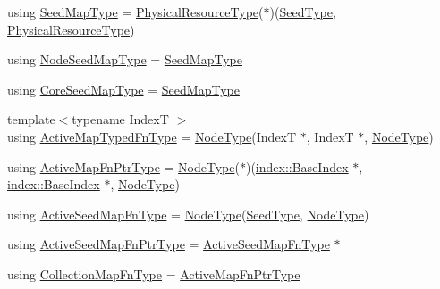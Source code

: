 \begin{DoxyCompactItemize}
\item 
using \hyperlink{namespacevt_1_1mapping_a1c1409d9af8d1ac402af022a65be4a4d}{Seed\+Map\+Type} = \hyperlink{namespacevt_a2dc36fcada816dc6d11774d650328ee9}{Physical\+Resource\+Type}($\ast$)(\hyperlink{namespacevt_ae2e13198bdef4d5b8e603d6c1c7f0969}{Seed\+Type}, \hyperlink{namespacevt_a2dc36fcada816dc6d11774d650328ee9}{Physical\+Resource\+Type})
\item 
using \hyperlink{namespacevt_1_1mapping_a84d654b657f2dbe639ada06ae688e4c7}{Node\+Seed\+Map\+Type} = \hyperlink{namespacevt_1_1mapping_a1c1409d9af8d1ac402af022a65be4a4d}{Seed\+Map\+Type}
\item 
using \hyperlink{namespacevt_1_1mapping_a963a37316992c8805e9a381a07380de0}{Core\+Seed\+Map\+Type} = \hyperlink{namespacevt_1_1mapping_a1c1409d9af8d1ac402af022a65be4a4d}{Seed\+Map\+Type}
\item 
{\footnotesize template$<$typename IndexT $>$ }\\using \hyperlink{namespacevt_1_1mapping_ad7c0812428b339edd904a865e0080ecd}{Active\+Map\+Typed\+Fn\+Type} = \hyperlink{namespacevt_a866da9d0efc19c0a1ce79e9e492f47e2}{Node\+Type}(IndexT $\ast$, IndexT $\ast$, \hyperlink{namespacevt_a866da9d0efc19c0a1ce79e9e492f47e2}{Node\+Type})
\item 
using \hyperlink{namespacevt_1_1mapping_a748d5efb71ca5878288d5809f57d7254}{Active\+Map\+Fn\+Ptr\+Type} = \hyperlink{namespacevt_a866da9d0efc19c0a1ce79e9e492f47e2}{Node\+Type}($\ast$)(\hyperlink{structvt_1_1index_1_1_base_index}{index\+::\+Base\+Index} $\ast$, \hyperlink{structvt_1_1index_1_1_base_index}{index\+::\+Base\+Index} $\ast$, \hyperlink{namespacevt_a866da9d0efc19c0a1ce79e9e492f47e2}{Node\+Type})
\item 
using \hyperlink{namespacevt_1_1mapping_ab9cfcd87eb3ff00e63478d0197056b7e}{Active\+Seed\+Map\+Fn\+Type} = \hyperlink{namespacevt_a866da9d0efc19c0a1ce79e9e492f47e2}{Node\+Type}(\hyperlink{namespacevt_ae2e13198bdef4d5b8e603d6c1c7f0969}{Seed\+Type}, \hyperlink{namespacevt_a866da9d0efc19c0a1ce79e9e492f47e2}{Node\+Type})
\item 
using \hyperlink{namespacevt_1_1mapping_a254b50d55be91c3bd002481b2e96da7e}{Active\+Seed\+Map\+Fn\+Ptr\+Type} = \hyperlink{namespacevt_1_1mapping_ab9cfcd87eb3ff00e63478d0197056b7e}{Active\+Seed\+Map\+Fn\+Type} $\ast$
\item 
using \hyperlink{namespacevt_1_1mapping_a2910ab582d95478603cdca7480af65b2}{Collection\+Map\+Fn\+Type} = \hyperlink{namespacevt_1_1mapping_a748d5efb71ca5878288d5809f57d7254}{Active\+Map\+Fn\+Ptr\+Type}
\end{DoxyCompactItemize}
